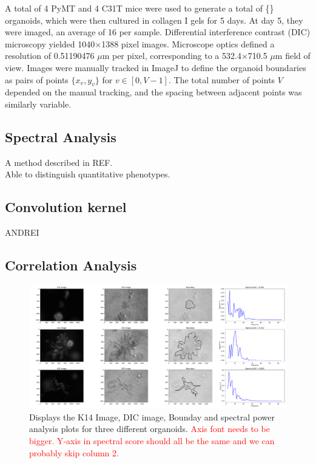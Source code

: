 \documentclass[runningheads]{llncs}
\begin{document}
 A total of 4 PyMT and 4 C31T mice were used to generate a total of \{\} organoids, which were then cultured in collagen I gels for 5 days. At day 5, they were imaged, an average of 16 per sample. Differential interference contrast (DIC) microscopy yielded 1040$\times$1388 pixel images. Microscope optics defined a resolution of 0.51190476 $\mu$m per pixel, corresponding to a 532.4$\times$710.5 $\mu$m field of view. Images were manually tracked in {\sc ImageJ} \cite{Schneider:2012ui} to define the organoid boundaries as pairs of points $\{x_v,y_v\}$ for $v \in [0,V-1]$. The total number of points $V$ depended on the manual tracking, and the spacing between adjacent points was similarly variable.


\subsection{Spectral Analysis}
A method described in REF.\\
Able to distinguish quantitative phenotypes.

\subsection{Convolution kernel}
ANDREI

\subsection{Correlation Analysis}

\begin{figure}
\includegraphics[width=\textwidth]{Image1.pdf}
\caption{Displays the K14 Image, DIC image, Bounday and spectral power analysis plots for three different organoids. \textcolor{red}{Axis font needs to be bigger. Y-axis in spectral score should all be the same and we can probably skip column 2.}} \label{fig1}
\end{figure}
\end{document}
